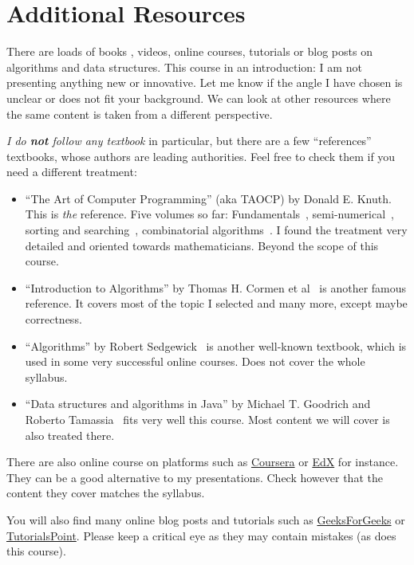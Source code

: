 \documentclass{aldast}
\begin{document}
\section{Additional Resources}
\label{sec:resources}

There are loads of books
\cite{atto1974,melhorn2008,levitin2011,weiss2014,skiena2020}, videos,
online courses, tutorials or blog posts on algorithms and data
structures. This course in an introduction: I am not presenting
anything new or innovative. Let me know if the angle I have chosen is
unclear or does not fit your background. We can look at other
resources where the same content is taken from a different
perspective.

\emph{I do \textbf{not} follow any textbook} in particular, but there
are a few ``references'' textbooks, whose authors are leading
authorities. Feel free to check them if you need a different treatment:

\begin{itemize}
\item ``The Art of Computer Programming'' (aka TAOCP) by Donald
  E. Knuth. This is \emph{the} reference. Five volumes so far:
  Fundamentals~\cite{knuth1978}, semi-numerical~\cite{knuth1997},
  sorting and searching~\cite{knuth1998}, combinato\-rial
  al\-go\-ri\-thms~\cite{knuth2011}. I found the treatment very detailed
  and oriented towards mathematicians. Beyond the scope
  of this course.
\item ``Introduction to Algorithms'' by Thomas H. Cormen et
  al~\cite{cormen2009} is another famous reference. It covers most of
  the topic I selected and many more, except maybe correctness.
\item ``Algorithms'' by Robert Sedgewick~\cite{sedgewick2014} is another
  well-known textbook, which is used in some very successful online
  courses. Does not cover the whole syllabus.
\item ``Data structures and algorithms in Java'' by Michael
  T. Goodrich and Roberto Tamassia~\cite{goodrich2014} fits very well this
  course. Most content we will cover is also treated there.
\end{itemize}

There are also online course on platforms such as
\href{https://www.coursera.org}{Coursera} or
\href{https://www.edx.org}{EdX} for instance. They can be a good
alternative to my presentations. Check however that the content they
cover matches the syllabus.

You will also find many online blog posts and tutorials such as
\href{www.geeksforgeeks.com}{GeeksForGeeks} or
\href{www.tutorialspoint.com}{TutorialsPoint}. Please keep a critical
eye as they may contain mistakes (as does this course).
\end{document}
